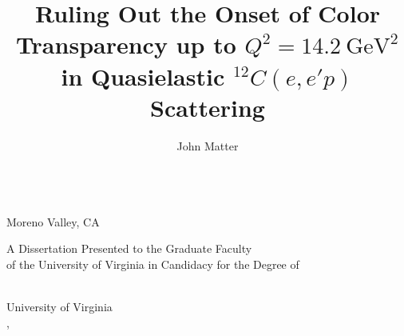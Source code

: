 \title{Ruling Out the Onset of Color Transparency up to $Q^2=\SI{14.2}{\giga\electronvolt\squared}$ in Quasielastic ${}^{12}C(e,e'p)$ Scattering}
\makeatletter
\bookmark[named=FirstPage]{\@title}
\makeatother

\makeatletter
\author{John Matter} \let\Author\@author
\newcommand{\hometown}{Moreno Valley, CA}

 \let\Year\@degreeyear
{}
\makeatother


\makeatletter
\def\maketitle{\begin{titlepage}
\doublespacing
\vspace{0.0in}
\large
{\LARGE\bf \@title \par}
\@author \\
\hometown
\par
\@prevdegrees
\par
A Dissertation Presented to the Graduate Faculty \\
of the University of Virginia in Candidacy for the Degree of \\
\@degree
\par
\@department \\
University of Virginia \\
\@degreemonth, \@degreeyear \\
\vspace{1.0in}

\begin{flushright}
\begin{minipage}{0.45\linewidth}
\mysignrule{}
\mysignrule{}
\mysignrule{}
\mysignrule{}
\end{minipage}
\end{flushright}

\end{titlepage}}
\makeatother
\maketitle


